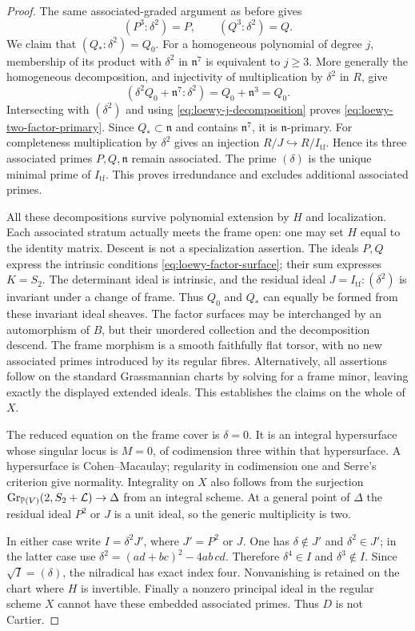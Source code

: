 \begin{proof}
The same associated-graded argument as before gives
\[
 (P^3:\delta^2)=P,\qquad (Q^3:\delta^2)=Q.
\]
We claim that $(Q_*:\delta^2)=Q_0$. For a homogeneous polynomial
of degree $j$, membership of its product with $\delta^2$ in
$\mathfrak n^7$ is equivalent to $j\ge3$. More generally the
homogeneous decomposition, and injectivity of multiplication by
$\delta^2$ in $R$, give
\[
 (\delta^2Q_0+\mathfrak n^7:\delta^2)
       =Q_0+\mathfrak n^3=Q_0.
\]
Intersecting with $(\delta^2)$ and using
\eqref{eq:loewy-j-decomposition} proves
\eqref{eq:loewy-two-factor-primary}. Since $Q_*\subset\mathfrak n$
and contains $\mathfrak n^7$, it is $\mathfrak n$-primary.
For completeness multiplication by $\delta^2$ gives an injection
$R/J\hookrightarrow R/I_{\mathrm{tf}}$. Hence its three associated
primes $P,Q,\mathfrak n$ remain associated. The prime $(\delta)$
is the unique minimal prime of $I_{\mathrm{tf}}$. This proves
irredundance and excludes additional associated primes.

All these decompositions survive polynomial extension by $H$ and
localization. Each associated stratum actually meets the frame open:
one may set $H$ equal to the identity matrix. Descent is not a
specialization assertion. The ideals $P,Q$ express the intrinsic
conditions \eqref{eq:loewy-factor-surface}; their sum expresses
$K=S_2$. The determinant ideal is intrinsic, and the residual ideal
$J=I_{\mathrm{tf}}:(\delta^2)$ is invariant under a change of frame.
Thus $Q_0$ and $Q_*$ can equally be formed from these invariant ideal
sheaves. The factor surfaces may be interchanged by an automorphism
of $B$, but their unordered collection and the decomposition descend.
The frame morphism is a smooth faithfully flat torsor, with no new
associated primes introduced by its regular fibres. Alternatively,
all assertions follow on the standard Grassmannian charts by solving
for a frame minor, leaving exactly the displayed extended ideals.
This establishes the claims on the whole of $X$.

The reduced equation on the frame cover is $\delta=0$. It is an
integral hypersurface whose singular locus is $M=0$, of codimension
three within that hypersurface. A hypersurface is Cohen--Macaulay;
regularity in codimension one and Serre's criterion give normality.
Integrality on $X$ also follows from the surjection
$\operatorname{Gr}_{\mathbb P(V)}(2,S_2+\mathcal L)\to\Delta$ from an integral scheme.
At a general point of $\Delta$ the residual ideal $P^2$ or $J$ is a
unit ideal, so the generic multiplicity is two.

In either case write $I=\delta^2J'$, where $J'=P^2$ or $J$.
One has $\delta\notin J'$ and $\delta^2\in J'$; in the latter
case use
$\delta^2=(ad+bc)^2-4ab\,cd$.
Therefore $\delta^4\in I$ and $\delta^3\notin I$.
Since $\sqrt I=(\delta)$, the nilradical has exact index four.
Nonvanishing is retained on the chart where $H$ is invertible.
Finally a nonzero principal ideal in the regular scheme $X$ cannot
have these embedded associated primes. Thus $D$ is not Cartier.
\end{proof}

